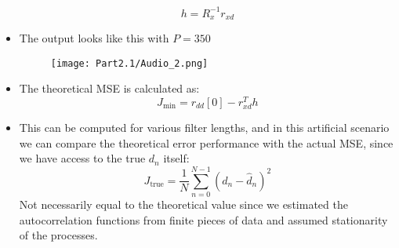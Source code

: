 \documentclass[12pt]{article}
\newcommand{\desest}{\hat{d}_n}
\newcommand{\des}{d_n}
\begin{document}
\begin{itemize}
    \[
    h = R_x^{-1}r_{xd}
    \]
    \item The output looks like this with $P =350$
    \begin{figure}[H]
        \centering
        \texttt{[image: Part2.1/Audio\_2.png]}
    \end{figure}
    \item The theoretical MSE is calculated as:
    \[
    J_{\min} = r_{dd}[0] - r_{xd}^T h
    \]
    \item This can be computed for various filter lengths, and in this artificial scenario we can compare the theoretical error performance with the actual MSE, since we have access to the true $d_n$ itself:
    \[
    J_{\textrm{true}}=\frac{1}{N}\sum_{n=0}^{N-1} (\des -\desest)^2
    \]
    Not necessarily equal to the theoretical value since we estimated the autocorrelation functions from finite pieces of data and assumed stationarity of the processes.

\end{itemize}
\end{document}
